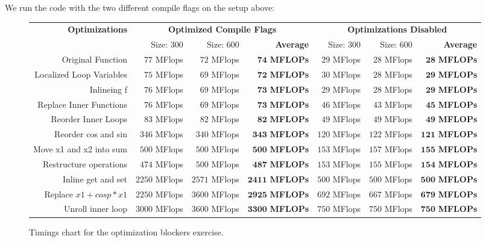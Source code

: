 \documentclass[portrait,a4paper]{article}
\begin{document}
We run the code with the two different compile flags on the setup above:
\begin{figure}[H]
    \hspace{-20mm}
    {\small
    \centering
    \begin{tabular}{r|rrr|rrr}
        \multirow{2}{*}{\textbf{Optimizations}} & \multicolumn{3}{c}{\textbf{Optimized Compile Flags}}
            & \multicolumn{3}{|c}{\textbf{Optimizations Disabled}} \\ 
                               & Size: $300$     & Size: $600$    & \textbf{Average}
                               & Size: $300$     & Size: $600$    & \textbf{Average}  \\ \hline
        Original Function & $77$ MFlops & $72$ MFlops & $\mathbf{74}$ \textbf{MFLOPs} 
           & $29$ MFlops & $28$ MFlops & $\mathbf{28}$ \textbf{MFLOPs}\\
        Localized Loop Variables & $75$ MFlops & $69$ MFlops & $\mathbf{72}$ \textbf{MFLOPs}            
           & $30$ MFlops & $28$ MFlops & $\mathbf{29}$ \textbf{MFLOPs}\\
        Inlineing f      & $76$ MFlops & $69$ MFlops & $\mathbf{73}$ \textbf{MFLOPs}
           & $29$ MFlops & $28$ MFlops & $\mathbf{29}$ \textbf{MFLOPs}\\
        Replace Inner Functions & $76$ MFlops & $69$ MFlops & $\mathbf{73}$ \textbf{MFLOPs} 
           & $46$ MFlops & $43$ MFlops & $\mathbf{45}$ \textbf{MFLOPs}\\
        Reorder Inner Loops & $83$ MFlops & $82$ MFlops & $\mathbf{82}$ \textbf{MFLOPs}
           & $49$ MFlops & $49$ MFlops & $\mathbf{49}$ \textbf{MFLOPs}\\
        Reorder cos and sin & $346$ MFlops & $340$ MFlops & $\mathbf{343}$ \textbf{MFLOPs}
           & $120$ MFlops & $122$ MFlops & $\mathbf{121}$ \textbf{MFLOPs}\\
        Move x1 and x2 into sum & $500$ MFlops & $500$ MFlops & $\mathbf{500}$ \textbf{MFLOPs}
           & $153$ MFlops & $157$ MFlops & $\mathbf{155}$ \textbf{MFLOPs}\\
        Restructure operations  & $474$ MFlops & $500$ MFlops & $\mathbf{487}$ \textbf{MFLOPs} 
           & $153$ MFlops & $155$ MFlops & $\mathbf{154}$ \textbf{MFLOPs}\\
        Inline get and set & $2250$ MFlops & $2571$ MFlops & $\mathbf{2411}$ \textbf{MFLOPs} 
           & $500$ MFlops & $500$ MFlops & $\mathbf{500}$ \textbf{MFLOPs}\\
        Replace $x1+cosp*x1$ & $2250$ MFlops & $3600$ MFlops & $\mathbf{2925}$ \textbf{MFLOPs}
           & $692$ MFlops & $667$ MFlops & $\mathbf{679}$ \textbf{MFLOPs}\\
        Unroll inner loop & $3000$ MFlops & $3600$ MFlops & $\mathbf{3300}$ \textbf{MFLOPs} 
           & $750$ MFlops & $750$ MFlops & $\mathbf{750}$ \textbf{MFLOPs}\\
    \end{tabular}
    }
    \caption{Timings chart for the optimization blockers exercise.}
\end{figure}
\end{document}
